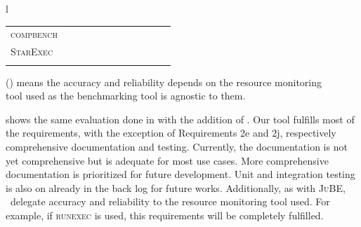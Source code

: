 \begin{table}
\begin{threeparttable}
\begin{adjustbox}{max width=\textwidth}
\begin{tabular}{l}
\begin{tabular}{l | cccccc | ccccc}
                    \textsc{compbench} &
                        & & & & & &
                        & \checkmark & \checkmark & & \checkmark \\
                    \textsc{StarExec} &
                        \checkmark & \checkmark & \checkmark & \checkmark & \checkmark & \checkmark &
						\checkmark & \checkmark & \checkmark & \checkmark & \checkmark \\
					\textbf{\OurBenchmarkingTool} &
						\textbf{\textasteriskcentered} & \textbf{\textasteriskcentered} & \textbf{\textasteriskcentered} & \textbf{\textasteriskcentered} & \textbf{\textasteriskcentered} & \textbf{\textasteriskcentered} &
						\pmb{\checkmark} & \pmb{\checkmark} & \pmb{\checkmark} & \pmb{\checkmark} & \pmb{\checkmark} \\
                    \bottomrule
                \end{tabular}
            \end{tabular}
        \end{adjustbox}
        \begin{tablenotes}
            \note (\textasteriskcentered) means the accuracy and reliability depends on the resource monitoring\\ tool used as the benchmarking tool is agnostic to them.
        \end{tablenotes}
    \end{threeparttable}
\end{table}

 shows the same evaluation done in  with the addition of \OurBenchmarkingTool.
Our tool fulfills most of the requirements, with the exception of Requirements 2e and 2j, respectively comprehensive documentation and testing.
Currently, the documentation is not yet comprehensive but is adequate for most use cases.
More comprehensive documentation is prioritized for future development.
Unit and integration testing is also on already in the back log for future works.
Additionally, as with \textsc{JuBE}, \first~delegate accuracy and reliability to the resource monitoring tool used.
For example, if \textsc{runexec} is used, this requirements will be completely fulfilled.
